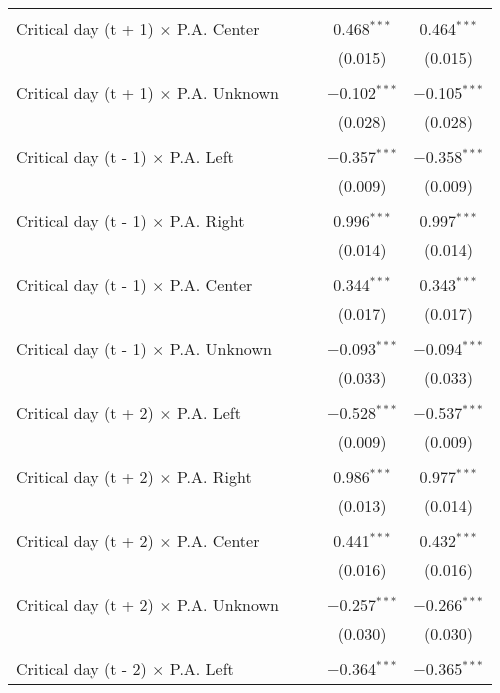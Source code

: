 \documentclass[
]{article}
\begin{document}
\begin{table}[!htbp]
{\begin{tabular}{@{\extracolsep{5pt}}lcccc}
  & & & & \\ 
 Critical day (t + 1) $\times$ P.A. Center &  &  & 0.468$^{***}$ & 0.464$^{***}$ \\ 
  &  &  & (0.015) & (0.015) \\ 
  & & & & \\ 
 Critical day (t + 1) $\times$ P.A. Unknown &  &  & $-$0.102$^{***}$ & $-$0.105$^{***}$ \\ 
  &  &  & (0.028) & (0.028) \\ 
  & & & & \\ 
 Critical day (t - 1) $\times$ P.A. Left &  &  & $-$0.357$^{***}$ & $-$0.358$^{***}$ \\ 
  &  &  & (0.009) & (0.009) \\ 
  & & & & \\ 
 Critical day (t - 1) $\times$ P.A. Right &  &  & 0.996$^{***}$ & 0.997$^{***}$ \\ 
  &  &  & (0.014) & (0.014) \\ 
  & & & & \\ 
 Critical day (t - 1) $\times$ P.A. Center &  &  & 0.344$^{***}$ & 0.343$^{***}$ \\ 
  &  &  & (0.017) & (0.017) \\ 
  & & & & \\ 
 Critical day (t - 1) $\times$ P.A. Unknown &  &  & $-$0.093$^{***}$ & $-$0.094$^{***}$ \\ 
  &  &  & (0.033) & (0.033) \\ 
  & & & & \\ 
 Critical day (t + 2) $\times$ P.A. Left &  &  & $-$0.528$^{***}$ & $-$0.537$^{***}$ \\ 
  &  &  & (0.009) & (0.009) \\ 
  & & & & \\ 
 Critical day (t + 2) $\times$ P.A. Right &  &  & 0.986$^{***}$ & 0.977$^{***}$ \\ 
  &  &  & (0.013) & (0.014) \\ 
  & & & & \\ 
 Critical day (t + 2) $\times$ P.A. Center &  &  & 0.441$^{***}$ & 0.432$^{***}$ \\ 
  &  &  & (0.016) & (0.016) \\ 
  & & & & \\ 
 Critical day (t + 2) $\times$ P.A. Unknown &  &  & $-$0.257$^{***}$ & $-$0.266$^{***}$ \\ 
  &  &  & (0.030) & (0.030) \\ 
  & & & & \\ 
 Critical day (t - 2) $\times$ P.A. Left &  &  & $-$0.364$^{***}$ & $-$0.365$^{***}$ \\ 

\end{tabular}}
\end{table}
\end{document}
